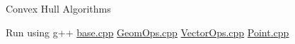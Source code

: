 Convex Hull Algorithms

Run using g++ \hyperlink{base_8cpp}{base.\+cpp} \hyperlink{GeomOps_8cpp}{Geom\+Ops.\+cpp} \hyperlink{VectorOps_8cpp}{Vector\+Ops.\+cpp} \hyperlink{Point_8cpp}{Point.\+cpp} 